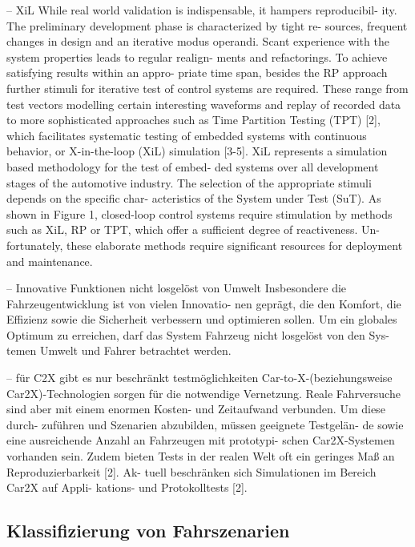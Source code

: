 -- XiL
While real world validation is indispensable, it hampers reproducibil- ity. The preliminary development phase is characterized by tight re- sources, frequent changes in design and an iterative modus operandi. Scant experience with the system properties leads to regular realign- ments and refactorings. To achieve satisfying results within an appro- priate time span, besides the RP approach further stimuli for iterative test of control systems are required. These range from test vectors modelling certain interesting waveforms and replay of recorded data to more sophisticated approaches such as Time Partition Testing (TPT) [2], which facilitates systematic testing of embedded systems with continuous behavior, or X-in-the-loop (XiL) simulation [3-5]. XiL represents a simulation based methodology for the test of embed- ded systems over all development stages of the automotive industry. The selection of the appropriate stimuli depends on the specific char- acteristics of the System under Test (SuT). As shown in Figure 1, closed-loop control systems require stimulation by methods such as XiL, RP or TPT, which offer a sufficient degree of reactiveness. Un- fortunately, these elaborate methods require significant resources for deployment and maintenance. \cite{bach2017reactive}



-- Innovative Funktionen nicht losgelöst von Umwelt
Insbesondere die Fahrzeugentwicklung ist von vielen Innovatio- nen geprägt, die den Komfort, die Effizienz sowie die Sicherheit verbessern und optimieren sollen. Um ein globales Optimum zu erreichen, darf das System Fahrzeug nicht losgelöst von den Sys- temen Umwelt und Fahrer betrachtet werden. \cite{albers2010x}

-- für C2X gibt es nur beschränkt testmöglichkeiten
Car-to-X-(beziehungsweise Car2X)-Technologien sorgen für die notwendige Vernetzung. Reale Fahrversuche sind aber mit einem enormen Kosten- und Zeitaufwand verbunden. Um diese durch- zuführen und Szenarien abzubilden, müssen geeignete Testgelän- de sowie eine ausreichende Anzahl an Fahrzeugen mit prototypi- schen Car2X-Systemen vorhanden sein. Zudem bieten Tests in der realen Welt oft ein geringes Maß an Reproduzierbarkeit [2]. Ak- tuell beschränken sich Simulationen im Bereich Car2X auf Appli- kations- und Protokolltests [2].\cite{albers2010x}


\subsection{Klassifizierung von Fahrszenarien}
\label{grundlagen_fahren_szenarien}

